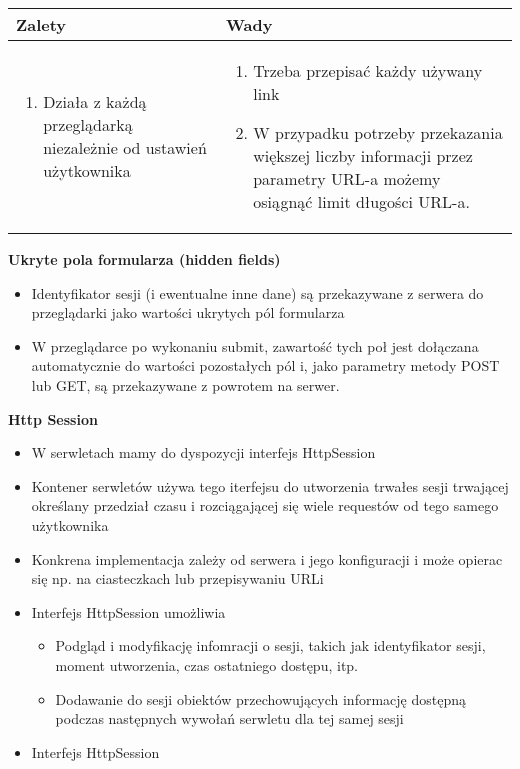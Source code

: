 \documentclass[../main.tex]{subfiles}
\begin{document}
    \begin{table}[H]
        \begin{center}
            \begin{tabular}{p{8cm} | p{8cm}}
                \textbf{Zalety} & \textbf{Wady}\\
                \hline
                \begin{enumerate}
                    \item Działa z każdą przeglądarką niezależnie od ustawień użytkownika
                \end{enumerate}
                &
                \begin{enumerate}
                    \item Trzeba przepisać każdy używany link
                    \item W przypadku potrzeby przekazania większej liczby informacji przez parametry URL-a możemy osiągnąć limit długości URL-a.
                \end{enumerate}\\
            \end{tabular}
        \end{center}
    \end{table}

    \textbf{Ukryte pola formularza (hidden fields)}
    \begin{itemize}
        \item Identyfikator sesji (i ewentualne inne dane) są przekazywane z serwera do przeglądarki jako wartości ukrytych pól formularza
        \item W przeglądarce po wykonaniu submit, zawartość tych poł jest dołączana automatycznie do wartości pozostałych pól i, jako parametry metody POST lub
        GET, są przekazywane z powrotem na serwer.
    \end{itemize}


    \textbf{Http Session}
    \begin{itemize}
        \item W serwletach mamy do dyspozycji interfejs HttpSession
        \item Kontener serwletów używa tego iterfejsu do utworzenia trwałes sesji trwającej określany przedział czasu i rozciągającej się wiele requestów od tego samego użytkownika
        \item Konkrena implementacja zależy od serwera i jego konfiguracji i może opierac się np. na ciasteczkach lub przepisywaniu URLi
        \item Interfejs HttpSession umożliwia
        \begin{itemize}
            \item Podgląd i modyfikację infomracji o sesji, takich jak identyfikator sesji, moment utworzenia, czas ostatniego dostępu, itp.
            \item Dodawanie do sesji obiektów przechowujących informację dostępną
            podczas następnych wywołań serwletu dla tej samej sesji
        \end{itemize}
        \item Interfejs HttpSession
    \end{itemize}
\end{document}
